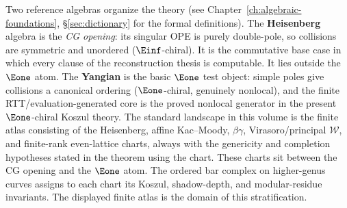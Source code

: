\begin{remark}
\label{rem:two-strata}
Two reference algebras organize the theory
(see Chapter~\ref{ch:algebraic-foundations}, \S\ref{sec:dictionary} for the formal definitions).
The \textbf{Heisenberg} algebra is the \emph{CG opening}: its singular
OPE is purely double-pole, so collisions are symmetric and unordered
($\Einf$-chiral). It is the commutative base case in which every
clause of the reconstruction thesis is computable. It lies outside the
$\Eone$ atom.
The \textbf{Yangian} is the basic $\Eone$ test object: simple poles
give collisions a canonical ordering ($\Eone$-chiral, genuinely
nonlocal), and the finite RTT/evaluation-generated core is the
proved nonlocal generator in the present $\Eone$-chiral Koszul
theory.
The standard landscape in this volume is the finite atlas consisting of
the Heisenberg, affine Kac--Moody, $\beta\gamma$, Virasoro/principal
$\mathcal W$, and finite-rank even-lattice charts, always with the
genericity and completion hypotheses stated in the theorem using the
chart. These charts sit between the CG opening and the $\Eone$ atom.
The ordered bar complex on higher-genus curves assigns to each chart its
Koszul, shadow-depth, and modular-residue invariants. The displayed
finite atlas is the domain of this stratification.
\end{remark}

